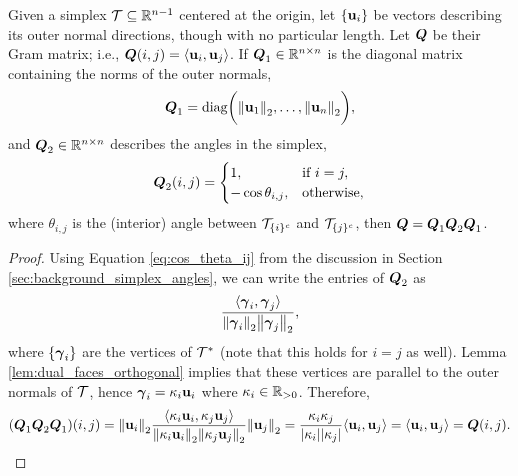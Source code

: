 \begin{lemma}
	Given a simplex $\mathcal{T}\subseteq\mathbb{R}^{n-1}$ centered at the origin, let $\{\vb{u}_i\}$ be vectors describing its outer normal directions, though with no particular length. Let $\vb*{Q}$ be their Gram matrix; i.e., $\vb*{Q}(i,j)=\langle \vb{u}_i,\vb{u}_j\rangle$. If $\vb*{Q}_1\in\mathbb{R}^{n\times n}$ is the diagonal matrix containing the norms of the outer normals, 
	\begin{equation*}
	\vb*{Q}_1 = \text{diag}\bigg(\norm{\vb{u}_1}_2,\dots,\norm{\vb{u}_n}_2\bigg),
	\end{equation*}
	and $\vb*{Q}_2\in\mathbb{R}^{n\times n}$ describes the angles in the simplex, 
	\begin{equation*}
	\vb*{Q}_2(i,j) = \begin{cases}
	1,& \text{if } i=j,\\
	-\cos\theta_{i,j},&\text{otherwise},
	\end{cases} 
	\end{equation*}
	where $\theta_{i,j}$ is the (interior) angle between $\mathcal{T}_{\{i\}^c}$ and $\mathcal{T}_{\{j\}^c}$, then $
	\vb*{Q} = \vb*{Q}_1 \vb*{Q}_2 \vb*{Q}_1$. 
\end{lemma}
\begin{proof}
	Using Equation \ref{eq:cos_theta_ij} from the discussion in Section \ref{sec:background_simplex_angles}, we can write the entries of $\vb*{Q}_2$ as 
	\[\frac{\langle \vb*{\gamma}_i,\vb*{\gamma}_j\rangle}{\norm{\vb*{\gamma}_i}_2\norm{\vb*{\gamma}_j}_2},\]
	where $\{\vb*{\gamma}_i\}$ are the vertices of $\mathcal{T}^*$ (note that this holds for $i=j$ as well). Lemma \ref{lem:dual_faces_orthogonal} implies that these vertices are parallel to the outer normals of $\mathcal{T}$, hence  $\vb*{\gamma}_i = \kappa_i \vb{u}_i$ where $\kappa_i\in \mathbb{R}_{> 0}$. Therefore, 
	\begin{equation*}
	(\vb*{Q}_1\vb*{Q}_2\vb*{Q}_1)(i,j) = \norm{\vb{u}_i}_2 \frac{\langle \kappa_i\vb{u}_i,\kappa_j\vb{u}_j\rangle}{\norm{\kappa_i\vb{u}_i}_2\norm{\kappa_j\vb{u}_j}_2}\norm{\vb{u}_j}_2 = \frac{\kappa_i\kappa_j}{|\kappa_i||\kappa_j|}\langle \vb{u}_i,\vb{u}_j\rangle = \langle \vb{u}_i,\vb{u}_j\rangle=\vb*{Q}(i,j).\qedhere
	\end{equation*}
\end{proof}

